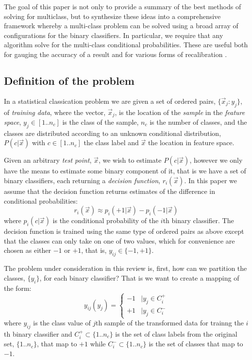 \documentclass{article}
\newenvironment{eqnnon}{\begin{equation*}}{\end{equation*}}
\begin{document}
The goal of this paper is not only to provide a summary of the
best methods of solving for multiclass, but to synthesize
these ideas into a comprehensive framework whereby a multi-class problem
can be solved using a broad array of configurations for the binary
classifiers. 
In particular, we require that any algorithm solve 
for the multi-class conditional probabilities.
These are useful both for gauging the accuracy of a result and for various
forms of recalibration \citep{Jolliffe_Stephenson2003,Fawcett2006,Mills2009,Mills2011}.

\subsection{Definition of the problem}

\label{description}

In a statistical classication problem we are given a set of ordered pairs, 
$\lbrace \vec x_j : y_j \rbrace$, of {\it training data},
where the vector, $\vec x_j$, is the location of the {\it sample} in 
the {\it feature space},
$y_j \in [1..n_c]$ is the class of the sample,
$n_c$ is the number of classes,
and the classes are
distributed according to an unknown conditional distribution,
$P(c | \vec x)$ with $c \in [1..n_c]$ the class label and $\vec x$ the location
in feature space.

Given an arbitrary {\it test point}, $\vec x$, 
we wish to estimate $P(c | \vec x)$, however we only have
the means to estimate some binary component of it, that is we have a 
set of binary classifiers, 
each returning a {\it decision function}, $r_i(\vec x)$.
In this paper we assume that the decision function 
returns estimates of the difference in conditional probabilities:
\begin{eqnnon}
	r_i(\vec x) \approx p_i(+1|\vec x) - p_i(-1|\vec x)
\end{eqnnon}
where $p_i(c|\vec x)$ is the conditional probability of the $i$th
binary classifier.
The decision function is trained using the same type of ordered pairs as
above except that the classes can only take on one of two values,
which for convenience are chosen as either $-1$ or $+1$, 
that is, $y_{ij} \in \lbrace -1, +1 \rbrace$.

The problem under consideration in this review is, first,
how can we partition the classes, $\lbrace y_i \rbrace$, for each binary
classifier?
That is we want to create a mapping of the form:
\begin{equation}
	y_{ij} (y_j) = \left \lbrace  \begin{array}{lr}
-1 & | y_j \in C_i^+ \\
+1 & | y_j \in C_i^-
\end{array}
	\right . \label{mapping}
\end{equation}
where $y_{ij}$ is the class value of $j$th sample of the transformed data 
for trainng the $i$th binary classifier and 
$C_i^+ \subset \lbrace 1..n_c \rbrace$ is the set of class labels from the original set,
$\lbrace 1..n_c \rbrace$, that map to $+1$ while
$C_i^- \subset \lbrace 1..n_c \rbrace$ is the set of classes that map to $-1$.
\end{document}
